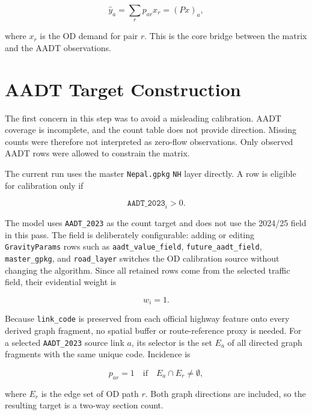\documentclass[11pt,a4paper]{article}
\begin{document}
\begin{equation}
\hat{y}_a = \sum_r p_{ar}x_r = (Px)_a,
\label{eq:count_equation}
\end{equation}

where $x_r$ is the OD demand for pair $r$. This is the core bridge between the
matrix and the AADT observations.

\section{AADT Target Construction}

The first concern in this step was to avoid a misleading calibration. AADT
coverage is incomplete, and the count table does not provide direction. Missing
counts were therefore not interpreted as zero-flow observations. Only observed
AADT rows were allowed to constrain the matrix.

The current run uses the master \texttt{Nepal.gpkg} \texttt{NH} layer directly. A row
is eligible for calibration only if

\begin{equation}
\texttt{AADT\_2023}_i>0 .
\end{equation}

The model uses \texttt{AADT\_2023} as the count target and does not use the
2024/25 field in this pass. The field is deliberately configurable: adding or
editing \texttt{GravityParams} rows such as \texttt{aadt\_value\_field},
\texttt{future\_aadt\_field}, \texttt{master\_gpkg}, and \texttt{road\_layer}
switches the OD calibration source without changing the algorithm. Since all
retained rows come from the selected traffic field, their evidential weight is

\begin{equation}
w_i=1 .
\end{equation}

Because \texttt{link\_code} is preserved from each official highway feature
onto every derived graph fragment, no spatial buffer or route-reference proxy
is needed. For a selected \texttt{AADT\_2023} source link $a$, its selector is
the set $E_a$ of all directed graph fragments with the same unique code.
Incidence is

\begin{equation}
p_{ar}=1 \quad \text{if} \quad E_a\cap E_r\neq\emptyset ,
\end{equation}

where $E_r$ is the edge set of OD path $r$. Both graph directions are included,
so the resulting target is a two-way section count.
\end{document}
